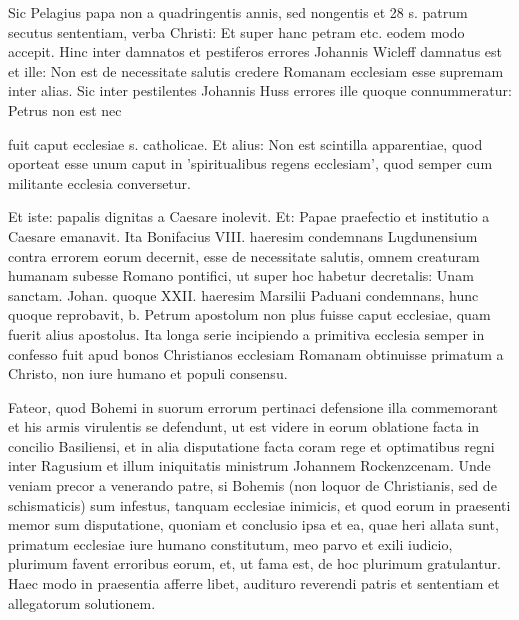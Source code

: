 Sic Pelagius papa non a quadringentis annis, sed nongentis et 28 s. patrum secutus sententiam, verba Christi: Et super hanc petram etc. eodem modo accepit. Hinc inter damnatos et pestiferos errores Johannis Wicleff damnatus est et ille: Non est de necessitate salutis credere Romanam ecclesiam esse supremam inter alias. Sic inter pestilentes Johannis Huss errores ille quoque connummeratur: Petrus non est nec

fuit caput ecclesiae s. catholicae. Et alius: Non est scintilla apparentiae, quod oporteat esse unum caput in 'spiritualibus regens ecclesiam', quod semper cum militante ecclesia conversetur.

Et iste: papalis dignitas a Caesare inolevit. Et: Papae praefectio et institutio a Caesare emanavit. Ita Bonifacius VIII. haeresim condemnans Lugdunensium contra errorem eorum decernit, esse de necessitate salutis, omnem creaturam humanam subesse Romano pontifici, ut super hoc habetur decretalis: Unam sanctam. Johan. quoque XXII. haeresim Marsilii Paduani condemnans, hunc quoque reprobavit, b. Petrum apostolum non plus fuisse caput ecclesiae, quam fuerit alius apostolus. Ita longa serie incipiendo a primitiva ecclesia semper in confesso fuit apud bonos Christianos ecclesiam Romanam obtinuisse primatum a Christo, non iure humano et populi consensu.

Fateor, quod Bohemi in suorum errorum pertinaci defensione illa commemorant et his armis virulentis se defendunt, ut est videre in eorum oblatione facta in concilio Basiliensi, et in alia disputatione facta coram rege et optimatibus regni inter Ragusium et illum iniquitatis ministrum Johannem Rockenzcenam. Unde veniam precor a venerando patre, si Bohemis (non loquor de Christianis, sed de schismaticis) sum infestus, tanquam ecclesiae inimicis, et quod eorum in praesenti memor sum disputatione, quoniam et conclusio ipsa et ea, quae heri allata sunt, primatum ecclesiae iure humano constitutum, meo parvo et exili iudicio, plurimum favent erroribus eorum, et, ut fama est, de hoc plurimum gratulantur. Haec modo in praesentia afferre libet, audituro reverendi patris et sententiam et allegatorum solutionem.

